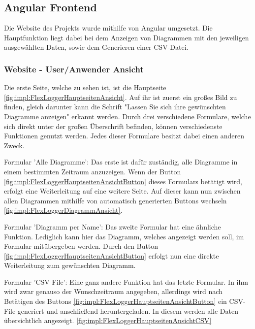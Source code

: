 \subsection{Angular Frontend}
Die Website des Projekts wurde mithilfe von Angular umgesetzt. Die Hauptfunktion liegt dabei bei dem Anzeigen von Diagrammen mit den jeweiligen ausgewählten Daten, sowie dem Generieren einer CSV-Datei.
 
 
\subsubsection{Website - User/Anwender Ansicht}
Die erste Seite, welche zu sehen ist, ist die Hauptseite \ref{fig:impl:FlexLoggerHauptseitenAnsicht}. Auf ihr ist zuerst ein großes Bild zu finden, gleich darunter kann die Schrift "Lassen Sie sich ihre gewünschten Diagramme anzeigen" erkannt werden.
Durch drei verschiedene Formulare, welche sich direkt unter der großen Überschrift befinden, können verschiedenste Funktionen genutzt werden. Jedes dieser Formulare besitzt dabei einen anderen Zweck.
 
\begin{compactitem}
    \item Formular 'Alle Diagramme': Das erste ist dafür zuständig, alle Diagramme in einem bestimmten Zeitraum anzuzeigen. Wenn der Button \ref{fig:impl:FlexLoggerHauptseitenAnsichtButton} dieses Formulars betätigt wird, erfolgt eine Weiterleitung auf eine weitere Seite. Auf dieser kann nun zwischen allen Diagrammen mithilfe von automatisch generierten Buttons wechseln \ref{fig:impl:FlexLoggerDiagrammAnsicht}.
    \item Formular 'Diagramm per Name': Das zweite Formular hat eine ähnliche Funktion. Lediglich kann hier das Diagramm, welches angezeigt werden soll, im Formular mitübergeben werden. Durch den Button \ref{fig:impl:FlexLoggerHauptseitenAnsichtButton} erfolgt nun eine direkte Weiterleitung zum gewünschten Diagramm.
    \item Formular 'CSV File': Eine ganz andere Funktion hat das letzte Formular. In ihm wird zwar genauso der Wunschzeitraum angegeben, allerdings wird nach Betätigen des Buttons \ref{fig:impl:FlexLoggerHauptseitenAnsichtButton} ein CSV-File generiert und anschließend heruntergeladen. In diesem werden alle Daten übersichtlich angezeigt. \ref{fig:impl:FlexLoggerHauptseitenAnsichtCSV}
\end{compactitem}
 
